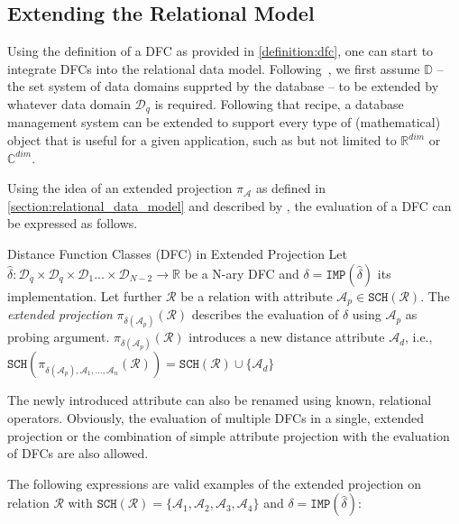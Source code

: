 \subsection{Extending the Relational Model}

Using the definition of a DFC as provided in \cref{definition:dfc}, one can start to integrate DFCs into the relational data model. Following~\cite{Giangreco:2018thesis}, we first assume  $\mathbb{D}$ -- the set system of data domains supprted by the database -- to be extended by whatever data domain $\mathcal{D}_q$ is required. Following that recipe, a database management system can be extended to support every type of (mathematical) object that is useful for a given application, such as but not limited to $\mathbb{R}^{dim}$ or $\mathbb{C}^{dim}$. 

Using the idea of an extended projection $\pi_{\mathcal{A}}$ as defined in \cref{section:relational_data_model} and described by \cite{Garcia:2009Database}, the evaluation of a DFC can be expressed as follows.

\begin{definition}[label=definition:spf_rel]{Distance Function Classes (DFC) in Extended Projection}{}
    Let $\hat{\delta} \colon \mathcal{D}_q \times \mathcal{D}_q \times \mathcal{D}_{1} ... \times \mathcal{D}_{N-2} \to \mathbb{R}$ be a N-ary DFC and $\delta = \mathtt{IMP}(\hat{\delta})$ its implementation. Let further $\mathcal{R}$ be a relation with attribute $\mathcal{A}_p \in \mathtt{SCH}(\mathcal{R})$. The \emph{extended projection} $\pi_{\delta(\mathcal{A}_p)}(\mathcal{R})$ describes the evaluation of $\delta$ using $\mathcal{A}_p$ as probing argument. $\pi_{\delta(\mathcal{A}_p)}(\mathcal{R})$ introduces a new distance attribute $\mathcal{A}_d$, i.e., $\mathtt{SCH}(\pi_{\delta(\mathcal{A}_p), \mathcal{A}_1, ..., \mathcal{A}_n}(\mathcal{R})) = \mathtt{SCH}(\mathcal{R}) \cup \{ \mathcal{A}_d \}$
\end{definition}

The newly introduced attribute can also be renamed using known, relational operators. Obviously, the evaluation of multiple DFCs in a single, extended projection or the combination of simple attribute projection with the evaluation of DFCs are also allowed. 

The following expressions are valid examples of the extended projection on relation $\mathcal{R}$ with $\mathtt{SCH}(\mathcal{R}) = \{ \mathcal{A}_1, \mathcal{A}_2, \mathcal{A}_3, \mathcal{A}_4 \}$ and $\delta = \mathtt{IMP}(\hat{\delta})$: 

